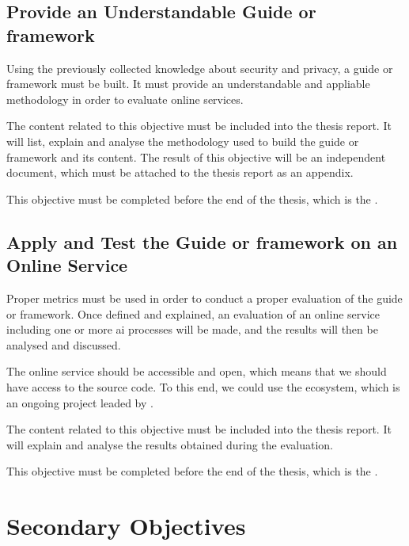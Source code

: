 \subsection{Provide an Understandable Guide or \Gls{framework}}
\label{sec:objectives_primary_guide}

Using the previously collected knowledge about security and privacy, a guide or \gls{framework} must be built. It must provide an understandable and appliable methodology in order to evaluate online services.

The content related to this objective must be included into the thesis report. It will list, explain and analyse the methodology used to build the guide or \gls{framework} and its content. The result of this objective will be an independent document, which must be attached to the thesis report as an appendix.

This objective must be completed before the end of the thesis, which is the .

\subsection{Apply and Test the Guide or \Gls{framework} on an Online Service}
\label{sec:objectives_primary_test}

Proper metrics must be used in order to conduct a proper evaluation of the guide or \gls{framework}. Once defined and explained, an evaluation of an online service including one or more \gls{ai} processes will be made, and the results will then be analysed and discussed.

The online service should be accessible and open, which means that we should have access to the source code. To this end, we could use the  ecosystem, which is an ongoing project leaded by \AdvisorOne.

The content related to this objective must be included into the thesis report. It will explain and analyse the results obtained during the evaluation.

This objective must be completed before the end of the thesis, which is the .

\section{Secondary Objectives}
\label{sec:objectives_secondary}

